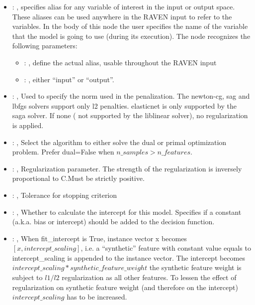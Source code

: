 \begin{itemize}
    \item {}: , 
      specifies alias for         any variable of interest in the input or output space. These
      aliases can be used anywhere in the RAVEN input to         refer to the variables. In the body
      of this node the user specifies the name of the variable that the model is going to use
      (during its execution).
      The  node recognizes the following parameters:
        \begin{itemize}
          \item {}: , 
            define the actual alias, usable throughout the RAVEN input
          \item {}: , 
            either ``input'' or ``output''.
      \end{itemize}

    \item {}: , 
      Used to specify the norm used in the penalization. The newton-cg, sag and lbfgs solvers
      support only l2 penalties. elasticnet is only supported by the saga solver. If none (
      not supported by the liblinear solver), no regularization is applied.

    \item {}: , 
      Select the algorithm to either solve the dual or primal optimization problem.
      Prefer dual=False when $n\_samples > n\_features$.

    \item {}: , 
      Regularization parameter. The strength of the regularization is inversely
      proportional to C.Must be strictly positive.

    \item {}: , 
      Tolerance for stopping criterion

    \item {}: , 
      Whether to calculate the intercept for this model. Specifies if a constant (a.k.a. bias or
      intercept) should be added to the decision function.

    \item {}: , 
      When fit\_intercept is True, instance vector x becomes $[x, intercept\_scaling]$,
      i.e. a “synthetic” feature with constant value equals to intercept\_scaling is appended
      to the instance vector. The intercept becomes $intercept\_scaling * synthetic\_feature\_weight$
      \nb the synthetic feature weight is subject to $l1/l2$ regularization as all other features.
      To lessen the effect of regularization on synthetic feature weight (and therefore on the
      intercept)                                                  $intercept\_scaling$ has to be
      increased.


\end{itemize}

